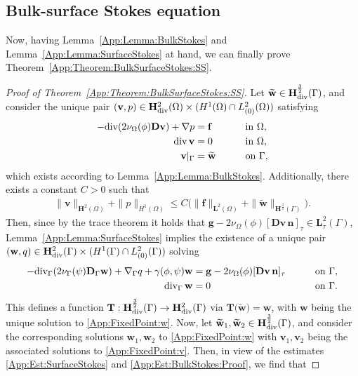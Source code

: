 \documentclass[10pt,reqno]{amsart}
\theoremstyle{remark}
\numberwithin{equation}{section}
\newcommand{\norm}[1]{\| #1 \|}
\newcommand{\n}{\mathbf{n}}
\newcommand{\bv}{\mathbf{v}}
\newcommand{\bw}{\mathbf{w}}
\newcommand{\tw}{\widetilde{\bw}}
\newcommand{\D}{\mathbf{D}}
\newcommand{\f}{\mathbf{f}}
\newcommand{\g}{\mathbf{g}}
\newcommand{\Dg}{\mathbf{D}_\Gamma}
\newcommand{\Grad}{\nabla}
\newcommand{\Div}{\textnormal{div}}
\newcommand{\Gradg}{\nabla_\Ga}
\newcommand{\Divg}{\textnormal{div}_\Ga}
\newcommand{\Om}{\Omega}
\newcommand{\Ga}{\Gamma}
\begin{document}
\subsection{Bulk-surface Stokes equation}

Now, having Lemma~\ref{App:Lemma:BulkStokes} and Lemma~\ref{App:Lemma:SurfaceStokes} at hand, we can finally prove Theorem~\ref{App:Theorem:BulkSurfaceStokes:SS}.


\begin{proof}[Proof of Theorem~\ref{App:Theorem:BulkSurfaceStokes:SS}]
    Let $\widetilde{\bw}\in\mathbf{H}^{\frac32}_\Div(\Ga)$, and consider the unique pair $(\bv,p)\in\mathbf{H}^2_\Div(\Om)\times(H^1(\Om)\cap L^2_{(0)}(\Om))$ satisfying
    \begin{alignat}{2}\label{App:FixedPoint:v}
        -\Div(2\nu_\Om(\phi)\D\bv) + \Grad p &= \f &&\qquad\text{in~}\Om, \nonumber \\
        \Div\,\bv &= 0 &&\qquad\text{in~}\Om, \\
        \bv\vert_\Ga &= \tw &&\qquad\text{on~}\Ga, \nonumber
    \end{alignat}
    which exists according to Lemma~\ref{App:Lemma:BulkStokes}. Additionally, there exists a constant $C > 0$ such that
    \begin{align}\label{App:Est:BulkStokes:Proof}
        \norm{\bv}_{\mathbf{H}^2(\Om)} + \norm{p}_{H^1(\Om)} \leq C\big(\norm{\f}_{\mathbf{L}^2(\Om)} + \norm{\tw}_{\mathbf{H}^{\frac32}(\Ga)}\big).
    \end{align}
    Then, since by the trace theorem it holds that $\g - 2\nu_\Om(\phi)[\D\bv\,\n]_\tau\in\mathbf{L}^2_{\tau}(\Ga)$, Lemma~\ref{App:Lemma:SurfaceStokes} implies the existence of a unique pair $(\bw,q)\in\mathbf{H}^2_\Div(\Ga)\times (H^1(\Ga)\cap L^2_{(0)}(\Ga))$ solving
    \begin{equation}\label{App:FixedPoint:w}
        \begin{aligned}
            -\Divg(2\nu_\Ga(\psi)\Dg\bw) + \Gradg q + \gamma(\phi,\psi)\bw &= \g - 2\nu_\Om(\phi)[\D\bv\,\n ]_\tau&&\qquad\text{on~}\Ga, \\
        \Divg\,\bw &= 0 &&\qquad\text{on~}\Ga.
        \end{aligned}
    \end{equation}
   This defines a function $\mathbf{T}:\mathbf{H}^{\frac32}_\Div(\Ga)\rightarrow\mathbf{H}^2_\Div(\Ga)$ via $\mathbf{T}\big(\widetilde{\bw}\big) = \bw$, with $\bw$ being the unique solution to \eqref{App:FixedPoint:w}. Now, let $\widetilde{\bw}_1,\widetilde{\bw}_2\in\mathbf{H}^{\frac32}_\Div(\Ga)$, and consider the corresponding solutions $\bw_1, \bw_2$ to \eqref{App:FixedPoint:w} with $\bv_1,\bv_2$ being the associated solutions to \eqref{App:FixedPoint:v}. Then, in view of the estimates \eqref{App:Est:SurfaceStokes} and \eqref{App:Est:BulkStokes:Proof}, we find that

\end{proof}
\end{document}
